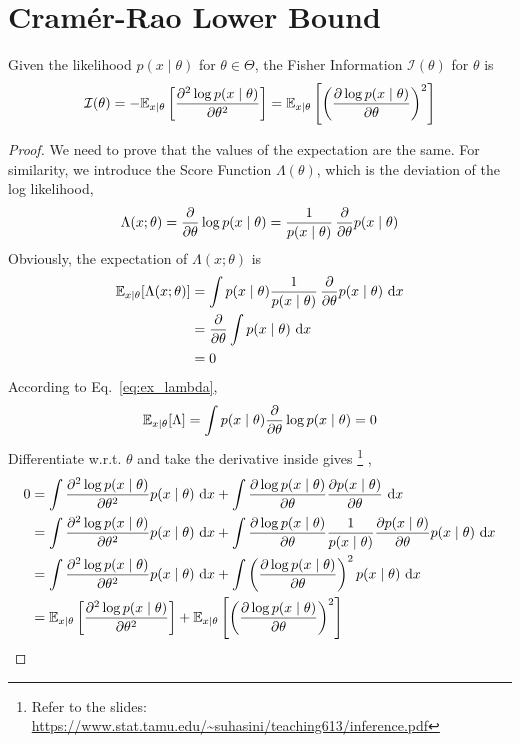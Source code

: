 \section{Cram\'er-Rao Lower Bound}\label{sec:CRLB}
\begin{definition}\label{proof:fisher}
	Given the likelihood $p(x \mid \theta)$ for $\theta \in \Theta $, the Fisher Information $\mathcal{I}(\theta)$ for $\theta$ is 	$$
	\mathcal{I}(\theta) = -\mathbb{E}_{x\mid \theta}\left[\frac{\partial^{2} \log p(x \mid \theta)}{\partial \theta^{2}}\right] = \mathbb{E}_{x\mid\theta}\left[\left(\frac{\partial\log p(x \mid \theta)}{\partial \theta}\right)^2 \right]
	$$
\end{definition}
\begin{proof} We need to prove that the values of the expectation are the same. 
For similarity, we introduce the Score Function $\Lambda(\theta)$, which is the deviation of the log likelihood,
\begin{equation}
	\Lambda(x;\theta) = \frac{\partial}{\partial \theta}\log p(x\mid \theta) = \frac{1}{p(x\mid \theta)}\, \frac{\partial}{\partial \theta} p(x\mid \theta)
\end{equation}
Obviously, the expectation of $\Lambda(x;\theta)$ is
\begin{align}\label{eq:ex_lambda}
	\mathbb{E}_{x\mid \theta}[\Lambda(x;\theta)] &= \int p(x\mid \theta) \frac{1}{p(x\mid \theta)}\, \frac{\partial}{\partial \theta} p(x\mid \theta) \ \mathrm{d}x \\
	&= \frac{\partial}{\partial \theta} \int p(x\mid \theta) \ \mathrm{d}x \\
	&= 0
	\end{align}
According to Eq.~\ref{eq:ex_lambda},
\begin{equation}
	\mathbb{E}_{x\mid \theta}[\Lambda] = \int p(x\mid \theta) \frac{\partial}{\partial \theta}\log p(x\mid \theta) = 0
\end{equation}
Differentiate w.r.t. $\theta$ and take the derivative inside gives \footnote{Refer to the slides: \url{https://www.stat.tamu.edu/~suhasini/teaching613/inference.pdf}}
,
\begin{align}
0 &= \int \frac{\partial^{2} \log p(x \mid \theta)}{\partial \theta^{2}} p(x \mid \theta) \ \mathrm{d}x+\int \frac{\partial \log p(x \mid \theta)}{\partial \theta} \frac{\partial p(x \mid \theta)}{\partial \theta} \ \mathrm{d}x \\
&= \int \frac{\partial^{2} \log p(x \mid \theta)}{\partial \theta^{2}} p(x \mid \theta) \ \mathrm{d}x+\int \frac{\partial \log p(x \mid \theta)}{\partial \theta} \frac{1}{p(x \mid \theta)} \frac{\partial p(x \mid \theta)}{\partial \theta} p(x \mid \theta) \ \mathrm{d}x\\
&= \int \frac{\partial^{2} \log p(x \mid \theta)}{\partial \theta^{2}} p(x \mid \theta) \ \mathrm{d}x+\int\left(\frac{\partial \log p(x \mid \theta)}{\partial \theta}\right)^{2} p(x \mid \theta) \ \mathrm{d}x \\
&= \mathbb{E}_{x\mid\theta}\left[\frac{\partial^{2} \log p(x \mid \theta)}{\partial \theta^{2}}\right] + \mathbb{E}_{x\mid\theta}\left[\left(\frac{\partial\log p(x \mid \theta)}{\partial \theta}\right)^2\right]
\end{align}
\end{proof}

